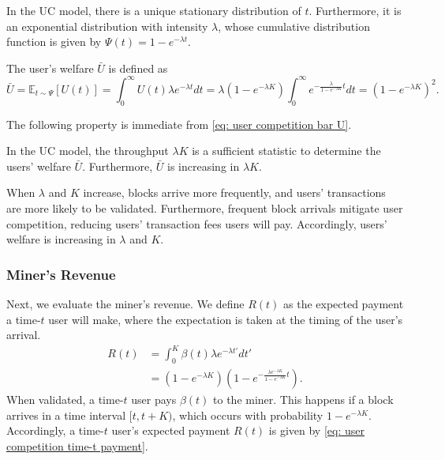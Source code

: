 \documentclass[12pt, letterpaper]{article}
\begin{document}
\begin{prop}\label{prop: stationary distribution}
    In the UC model, there is a unique stationary distribution of $t$. Furthermore, it is an exponential distribution with intensity $\lambda$, whose cumulative distribution function is given by $\Psi(t) = 1 - e^{- \lambda t}$.
\end{prop}



The user's welfare $\bar{U}$ is defined as
\begin{equation}
    \bar{U} = \mathbb{E}_{t \sim \Psi}[U(t)]
    =\int_0^\infty U(t) \lambda e^{-\lambda t} dt
    = \lambda \left(1 - e^{-\lambda K} \right) \int_0^\infty e^{- \frac{\lambda}{1 - e^{-\lambda K}} t}dt
    = \left(1 - e^{-\lambda K} \right)^2.\label{eq: user competition bar U}
\end{equation}

The following property is immediate from \eqref{eq: user competition bar U}.

\begin{prop}
    In the UC model, the throughput $\lambda K$ is a sufficient statistic to determine the users' welfare $\bar{U}$. Furthermore, $\bar{U}$ is increasing in $\lambda K$.
\end{prop}

When $\lambda$ and $K$ increase, blocks arrive more frequently, and users' transactions are more likely to be validated. Furthermore, frequent block arrivals mitigate user competition, reducing users' transaction fees users will pay. Accordingly, users' welfare is increasing in $\lambda$ and $K$.



\subsubsection{Miner's Revenue}

Next, we evaluate the miner's revenue. We define $R(t)$ as the expected payment a time-$t$ user will make, where the expectation is taken at the timing of the user's arrival.
\begin{align}
    R(t) &= \int_0^K \beta(t) \lambda e^{-\lambda t'}dt' \label{eq: user competition time-t payment}\\
    &= \left(1 - e^{-\lambda K} \right) \left(1 - e^{- \frac{\lambda e^{-\lambda K}}{1 - e^{-\lambda K}}t}\right).
\end{align}
When validated, a time-$t$ user pays $\beta(t)$ to the miner. This happens if a block arrives in a time interval $[t, t + K)$, which occurs with probability $1 - e^{-\lambda K}$. Accordingly, a time-$t$ user's expected payment $R(t)$ is given by \eqref{eq: user competition time-t payment}.
\end{document}
